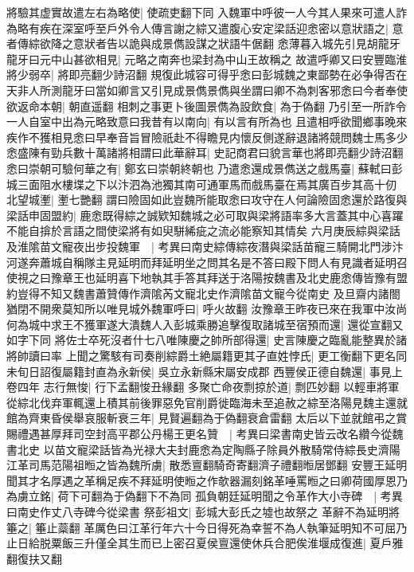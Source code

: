 將驗其虚實故遣左右為略使|{
	使疏吏翻下同}
入魏軍中呼彼一人今其人果來可遣人詐為略有疾在深室呼至戶外令人傳言謝之綜又遣腹心安定梁話迎悆密以意狀語之|{
	意者傳綜欲降之意狀者告以詭與成景儁設謀之狀語牛倨翻}
悆薄暮入城先引見胡龍牙龍牙曰元中山甚欲相見|{
	元略之南奔也梁封為中山王故稱之}
故遣呼卿又曰安豐臨淮將少弱卒|{
	將即亮翻少詩沼翻}
規復此城容可得乎悆曰彭城魏之東鄙勢在必争得否在天非人所測龍牙曰當如卿言又引見成景儁景儁與坐謂曰卿不為刺客邪悆曰今者奉使欲返命本朝|{
	朝直遥翻}
相刺之事更卜後圖景儁為設飲食|{
	為于偽翻}
乃引至一所詐令一人自室中出為元略致意曰我昔有以南向|{
	有以言有所為也}
且遣相呼欲聞鄉事晚來疾作不獲相見悆曰早奉音旨冒險祇赴不得瞻見内懷反側遂辭退諸將競問魏士馬多少悆盛陳有勁兵數十萬諸將相謂曰此華辭耳|{
	史記商君曰貌言華也將即亮翻少詩沼翻}
悆曰崇朝可驗何華之有|{
	鄭玄曰崇朝終朝也}
乃遣悆還成景儁送之戲馬臺|{
	蘇軾曰彭城三面阻水樓堞之下以汴泗為池獨其南可通軍馬而戲馬臺在焉其廣百步其高十仞}
北望城壍|{
	壍七艷翻}
謂曰險固如此豈魏所能取悆曰攻守在人何論險固悆還於路復與梁話申固盟約|{
	鹿悆既得綜之誠欵知魏城之必可取與梁將語率多大言蓋其中心喜躍不能自揜於言語之間使梁將有如臾駢絺疵之流必能察知其情矣}
六月庚辰綜與梁話及淮隂苗文寵夜出步投魏軍　|{
	考異曰南史綜傳綜夜潛與梁話苗寵三騎開北門涉汴河遂奔蕭城自稱隊主見延明而拜延明坐之問其名是不答曰殿下問人有見識者延明召使視之曰豫章王也延明喜下地執其手答其拜送于洛陽按魏書及北史鹿悆傳皆豫有盟約豈得不知又魏書蕭贊傳作濟隂芮文寵北史作濟隂苗文寵今從南史}
及旦齋内諸閤猶閉不開衆莫知所以唯見城外魏軍呼曰|{
	呼火故翻}
汝豫章王昨夜已來在我軍中汝尚何為城中求王不獲軍遂大潰魏人入彭城乘勝追擊復取諸城至宿預而還|{
	還從宣翻又如字下同}
將佐士卒死沒者什七八唯陳慶之帥所部得還|{
	史言陳慶之臨亂能整異於諸將帥讀曰率}
上聞之驚駭有司奏削綜爵土絶屬籍更其子直姓悖氏|{
	更工衡翻下更名同}
未旬日詔復屬籍封直為永新侯|{
	吳立永新縣宋屬安成郡}
西豐侯正德自魏還|{
	事見上卷四年}
志行無悛|{
	行下孟翻悛丑緣翻}
多聚亡命夜剽掠於道|{
	剽匹妙翻}
以輕車將軍從綜北伐弃軍輒還上積其前後罪惡免官削爵徙臨海未至追赦之綜至洛陽見魏主還就館為齊東昏侯舉哀服斬衰三年|{
	見賢遍翻為于偽翻衰倉雷翻}
太后以下並就館弔之賞賜禮遇甚厚拜司空封高平郡公丹楊王更名贊　|{
	考異曰梁書南史皆云改名纘今從魏書北史}
以苗文寵梁話皆為光禄大夫封鹿悆為定陶縣子除員外散騎常侍綜長史濟陽江革司馬范陽祖暅之皆為魏所虜|{
	散悉亶翻騎奇寄翻濟子禮翻暅居鄧翻}
安豐王延明聞其才名厚遇之革稱足疾不拜延明使暅之作欹器漏刻銘革唾罵暅之曰卿荷國厚恩乃為虜立銘|{
	荷下可翻為于偽翻下不為同}
孤負朝廷延明聞之令革作大小寺碑　|{
	考異曰南史作丈八寺碑今從梁書}
祭彭祖文|{
	彭城大彭氏之墟也故祭之}
革辭不為延明將箠之|{
	箠止蘂翻}
革厲色曰江革行年六十今日得死為幸誓不為人執筆延明知不可屈乃止日給脱粟飯三升僅全其生而已上密召夏侯亶還使休兵合肥俟淮堰成復進|{
	夏戶雅翻復扶又翻}
